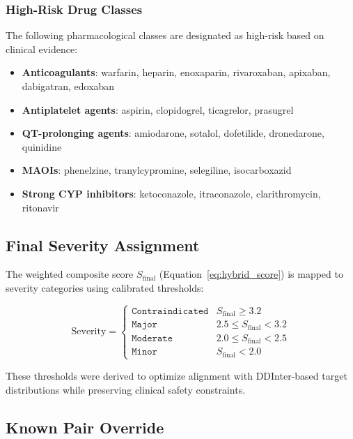 \documentclass[11pt,a4paper]{article}
\begin{document}
\subsubsection{High-Risk Drug Classes}

The following pharmacological classes are designated as high-risk based on clinical evidence:

\begin{itemize}
    \item \textbf{Anticoagulants}: warfarin, heparin, enoxaparin, rivaroxaban, apixaban, dabigatran, edoxaban
    \item \textbf{Antiplatelet agents}: aspirin, clopidogrel, ticagrelor, prasugrel
    \item \textbf{QT-prolonging agents}: amiodarone, sotalol, dofetilide, dronedarone, quinidine
    \item \textbf{MAOIs}: phenelzine, tranylcypromine, selegiline, isocarboxazid
    \item \textbf{Strong CYP inhibitors}: ketoconazole, itraconazole, clarithromycin, ritonavir
\end{itemize}

\subsection{Final Severity Assignment}

The weighted composite score $S_{\text{final}}$ (Equation~\ref{eq:hybrid_score}) is mapped to severity categories using calibrated thresholds:

\begin{equation}
\text{Severity} = 
\begin{cases}
\texttt{Contraindicated} & S_{\text{final}} \geq 3.2 \\
\texttt{Major} & 2.5 \leq S_{\text{final}} < 3.2 \\
\texttt{Moderate} & 2.0 \leq S_{\text{final}} < 2.5 \\
\texttt{Minor} & S_{\text{final}} < 2.0
\end{cases}
\end{equation}

These thresholds were derived to optimize alignment with DDInter-based target distributions while preserving clinical safety constraints.

\subsection{Known Pair Override}
\end{document}
